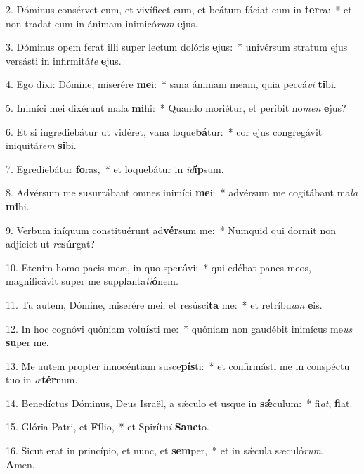 2. Dóminus consérvet eum, et vivíficet eum, et beátum fáciat eum in \textbf{ter}ra:~*  et non tradat eum in ánimam inimicó\textit{rum} \textbf{e}jus.\

3. Dóminus opem ferat illi super lectum dolóris \textbf{e}jus:~*  univérsum stratum ejus versásti in infirmitá\textit{te} \textbf{e}jus.\

4. Ego dixi: Dómine, miserére \textbf{me}i:~*  sana ánimam meam, quia peccá\textit{vi} \textbf{ti}bi.\

5. Inimíci mei dixérunt mala \textbf{mi}hi:~*  Quando moriétur, et períbit no\textit{men} \textbf{e}jus?\

6. Et si ingrediebátur ut vidéret, vana loque\textbf{bá}tur:~*  cor ejus congregávit iniquitá\textit{tem} \textbf{si}bi.\

7. Egrediebátur \textbf{fo}ras,~*  et loquebátur in \textit{id}\textbf{íp}sum.\

8. Advérsum me susurrábant omnes inimíci \textbf{me}i:~*  advérsum me cogitábant ma\textit{la} \textbf{mi}hi.\

9. Verbum iníquum constituérunt ad\textbf{vér}sum me:~*  Numquid qui dormit non adjíciet ut \textit{re}\textbf{súr}gat?\

10. Etenim homo pacis meæ, in quo spe\textbf{rá}vi:~*  qui edébat panes meos, magnificávit super me supplanta\textit{ti}\textbf{ó}nem.\

11. Tu autem, Dómine, miserére mei, et resúsci\textbf{ta} me:~*  et retríbu\textit{am} \textbf{e}is.\

12. In hoc cognóvi quóniam volu\textbf{ís}ti me:~*  quóniam non gaudébit inimícus me\textit{us} \textbf{su}per me.\

13. Me autem propter innocéntiam susce\textbf{pís}ti:~*  et confirmásti me in conspéctu tuo in \textit{æ}\textbf{tér}num.\

14. Benedíctus Dóminus, Deus Israël, a sǽculo et usque in \textbf{sǽ}culum:~*  fi\textit{at}, \textbf{fi}at.\

15. Glória Patri, et \textbf{Fí}lio,~*  et Spirítu\textit{i} \textbf{Sanc}to.\

16. Sicut erat in princípio, et nunc, et \textbf{sem}per,~*  et in sǽcula sæculó\textit{rum}. \textbf{A}men.\

